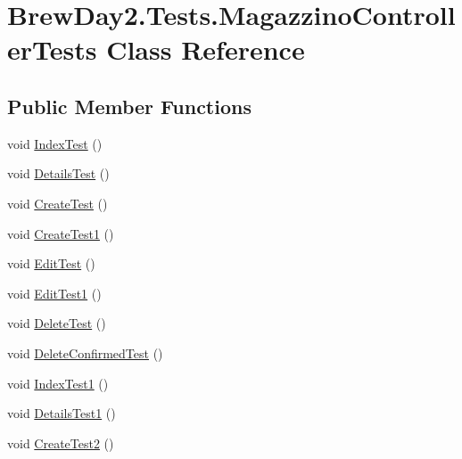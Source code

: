 \hypertarget{class_brew_day2_1_1_tests_1_1_magazzino_controller_tests}{}\section{Brew\+Day2.\+Tests.\+Magazzino\+Controller\+Tests Class Reference}
\label{class_brew_day2_1_1_tests_1_1_magazzino_controller_tests}
\subsection*{Public Member Functions}
\begin{DoxyCompactItemize}
\item 
void \mbox{\hyperlink{class_brew_day2_1_1_tests_1_1_magazzino_controller_tests_ac14fcccb97016fafaa0e5909742c7a1d}{Index\+Test}} ()
\item 
void \mbox{\hyperlink{class_brew_day2_1_1_tests_1_1_magazzino_controller_tests_a7d84313514afaea60984af7bb3922dd7}{Details\+Test}} ()
\item 
void \mbox{\hyperlink{class_brew_day2_1_1_tests_1_1_magazzino_controller_tests_a88b6ff031fc2b5afb9e0494f29364332}{Create\+Test}} ()
\item 
void \mbox{\hyperlink{class_brew_day2_1_1_tests_1_1_magazzino_controller_tests_a163055aa401b068da4d96aa25c9a2ef0}{Create\+Test1}} ()
\item 
void \mbox{\hyperlink{class_brew_day2_1_1_tests_1_1_magazzino_controller_tests_af7a2f172c9d71200e53c3c3b002a4979}{Edit\+Test}} ()
\item 
void \mbox{\hyperlink{class_brew_day2_1_1_tests_1_1_magazzino_controller_tests_a918b5d872338c91278ad3d9ee7e275e4}{Edit\+Test1}} ()
\item 
void \mbox{\hyperlink{class_brew_day2_1_1_tests_1_1_magazzino_controller_tests_a4a1da1a9e3a69a4fb2590b7a19e6fcc2}{Delete\+Test}} ()
\item 
void \mbox{\hyperlink{class_brew_day2_1_1_tests_1_1_magazzino_controller_tests_ac2fd375f37a193b288acc7d2ac7501d3}{Delete\+Confirmed\+Test}} ()
\item 
void \mbox{\hyperlink{class_brew_day2_1_1_tests_1_1_magazzino_controller_tests_ac7606c062246a9a336e6815c23cfb673}{Index\+Test1}} ()
\item 
void \mbox{\hyperlink{class_brew_day2_1_1_tests_1_1_magazzino_controller_tests_a6a730a4c773eea299f5cba571230fa23}{Details\+Test1}} ()
\item 
void \mbox{\hyperlink{class_brew_day2_1_1_tests_1_1_magazzino_controller_tests_abc2a2fd46af52127d6e1751485bd7076}{Create\+Test2}} ()

\end{DoxyCompactItemize}
